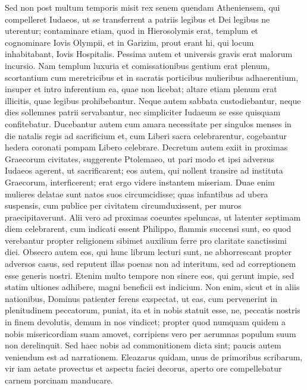 \begin{biblechapter}  
\verse Sed non post multum temporis misit rex senem quendam Atheniensem, qui compelleret Iudaeos, ut se transferrent a patriis legibus et Dei legibus ne uterentur; 
\verse contaminare etiam, quod in Hierosolymis erat, templum et cognominare Iovis Olympii, et in Garizim, prout erant hi, qui locum inhabitabant, Iovis Hospitalis. 
\verse Pessima autem et universis gravis erat malorum incursio. 
\verse Nam templum luxuria et comissationibus gentium erat plenum, scortantium cum meretricibus et in sacratis porticibus mulieribus adhaerentium, insuper et intro inferentium ea, quae non licebat; 
\verse altare etiam plenum erat illicitis, quae legibus prohibebantur. 
\verse Neque autem sabbata custodiebantur, neque dies sollemnes patrii servabantur, nec simpliciter Iudaeum se esse quisquam confitebatur. 
\verse Ducebantur autem cum amara necessitate per singulos menses in die natalis regis ad sacrificium et, cum Liberi sacra celebrarentur, cogebantur hedera coronati pompam Libero celebrare.  
\verse Decretum autem exiit in proximas Graecorum civitates, suggerente Ptolemaeo, ut pari modo et ipsi adversus Iudaeos agerent, ut sacrificarent; 
\verse eos autem, qui nollent transire ad instituta Graecorum, interficerent; erat ergo videre instantem miseriam. 
\verse Duae enim mulieres delatae sunt natos suos circumcidisse; quas infantibus ad ubera suspensis, cum publice per civitatem circumduxissent, per muros praecipitaverunt. 
\verse Alii vero ad proximas coeuntes speluncas, ut latenter septimam diem celebrarent, cum indicati essent Philippo, flammis succensi sunt, eo quod verebantur propter religionem sibimet auxilium ferre pro claritate sanctissimi diei. 
\verse Obsecro autem eos, qui hunc librum lecturi sunt, ne abhorrescant propter adversos casus, sed reputent illas poenas non ad interitum, sed ad correptionem esse generis nostri. 
\verse Etenim multo tempore non sinere eos, qui gerunt impie, sed statim ultiones adhibere, magni beneficii est indicium. 
\verse Non enim, sicut et in aliis nationibus, Dominus patienter ferens exspectat, ut eas, cum pervenerint in plenitudinem peccatorum, puniat, ita et in nobis statuit esse, 
\verse ne, peccatis nostris in finem devolutis, demum in nos vindicet;  
\verse propter quod numquam quidem a nobis misericordiam suam amovet, corripiens vero per aerumnas populum suum non derelinquit. 
\verse Sed haec nobis ad commonitionem dicta sint; paucis autem veniendum est ad narrationem. 
\verse Eleazarus quidam, unus de primoribus scribarum, vir iam aetate provectus et aspectu faciei decorus, aperto ore compellebatur carnem porcinam manducare.  

\end{biblechapter}
